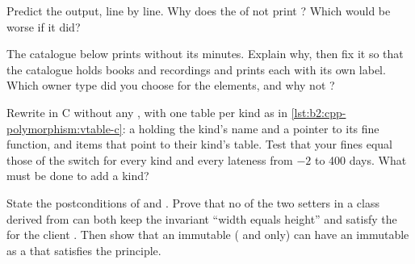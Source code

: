 \begin{exercise}[$\star\star$]\label{exo:b2:cpp-polymorphism:5}
Predict the output, line by line. Why does the  of  not print ? Which
would be worse if it did?
\end{exercise}

\begin{exercise}[$\star\star$]\label{exo:b2:cpp-polymorphism:6}
The catalogue below prints  without its minutes. Explain why, then fix it so that the catalogue
holds books and recordings and prints each with its own label. Which owner type did you choose for the elements,
and why not ?
\end{exercise}

\begin{exercise}[$\star\star$]\label{exo:b2:cpp-polymorphism:7}
Rewrite  in C without any , with one table per kind as in
\cref{lst:b2:cpp-polymorphism:vtable-c}: a  holding the kind's name and a pointer to its fine
function, and items that point to their kind's table. Test that your fines equal those of the switch for every
kind and every lateness from $-2$ to 400 days. What must be done to add a kind?
\end{exercise}

\begin{exercise}[$\star\star$]\label{exo:b2:cpp-polymorphism:8}
State the postconditions of  and . Prove that no  of the two
setters in a class  derived from  can both keep the invariant ``width equals height''
and satisfy the  for the client . Then show that an immutable
 ( and  only) can have an immutable  as a  that
satisfies the principle.
\end{exercise}

